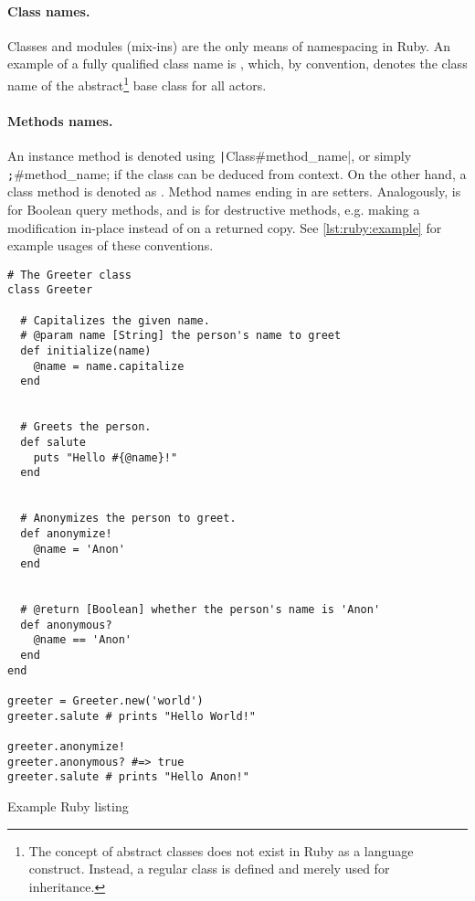 \paragraph*{Class names.} Classes and modules (mix-ins) are the only means of
namespacing in Ruby. An example of a fully qualified class name is ,
which, by convention, denotes the class name of the abstract\footnote{The concept of abstract classes
does not exist in Ruby as a language construct. Instead, a regular class is defined and merely used
for inheritance.} base class for all actors.

\paragraph*{Methods names.} An
instance method is denoted using \texttt|Class#method_name|, or simply
\texttt;#method_name; if the class
can be deduced from context. On the other hand, a class method is denoted as
. Method names ending in \sh{=} are setters. Analogously, 
is for Boolean query methods, and \sh{!} is for destructive methods, e.g. making a
modification in-place instead of on a returned copy. See
\autoref{lst:ruby:example} for example usages of these conventions.


\begin{listing}
	\begin{verbatim}
# The Greeter class
class Greeter

  # Capitalizes the given name.
  # @param name [String] the person's name to greet
  def initialize(name)
    @name = name.capitalize
  end


  # Greets the person.
  def salute
    puts "Hello #{@name}!"
  end


  # Anonymizes the person to greet.
  def anonymize!
    @name = 'Anon'
  end


  # @return [Boolean] whether the person's name is 'Anon'
  def anonymous?
    @name == 'Anon'
  end
end

greeter = Greeter.new('world')
greeter.salute # prints "Hello World!"

greeter.anonymize!
greeter.anonymous? #=> true
greeter.salute # prints "Hello Anon!"
	\end{verbatim}
	\caption{Example Ruby listing}
	\label{lst:ruby:example}
\end{listing}

